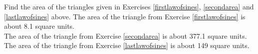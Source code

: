 { Find the area of the triangles given in Exercises \ref{firstlawofsines}, \ref{secondarea} and \ref{lastlawofsines} above.}
{The area of the triangle from Exercise \ref{firstlawofsines} is about 8.1 square units.\\The area of the triangle from Exercise \ref{secondarea} is about 377.1 square units.\\The area of the triangle from Exercise \ref{lastlawofsines} is about 149 square units.}
